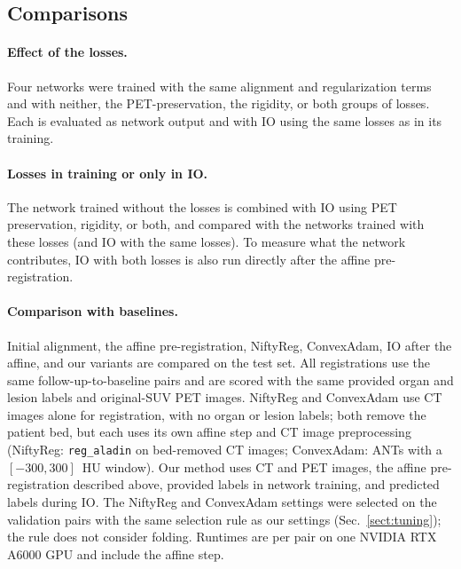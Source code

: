 \subsection{Comparisons}
\label{sect:ablations}

\paragraph{Effect of the losses.}
Four networks were trained with the same alignment and regularization terms and with neither, the PET-preservation, the rigidity, or both groups of losses.
Each is evaluated as network output and with IO using the same losses as in its training.

\paragraph{Losses in training or only in IO.}
The network trained without the losses is combined with IO using PET preservation, rigidity, or both, and compared with the networks trained with these losses (and IO with the same losses).
To measure what the network contributes, IO with both losses is also run directly after the affine pre-registration.

\paragraph{Comparison with baselines.}
Initial alignment, the affine pre-registration, NiftyReg, ConvexAdam, IO after the affine, and our variants are compared on the test set.
All registrations use the same follow-up-to-baseline pairs and are scored with the same provided organ and lesion labels and original-SUV PET images.
NiftyReg and ConvexAdam use CT images alone for registration, with no organ or lesion labels; both remove the patient bed, but each uses its own affine step and CT image preprocessing (NiftyReg: \texttt{reg\_aladin} on bed-removed CT images; ConvexAdam: ANTs with a $[-300,300]$~HU window).
Our method uses CT and PET images, the affine pre-registration described above, provided labels in network training, and predicted labels during IO.
The NiftyReg and ConvexAdam settings were selected on the validation pairs with the same selection rule as our settings (Sec.~\ref{sect:tuning}); the rule does not consider folding.
Runtimes are per pair on one NVIDIA RTX A6000 GPU and include the affine step.

